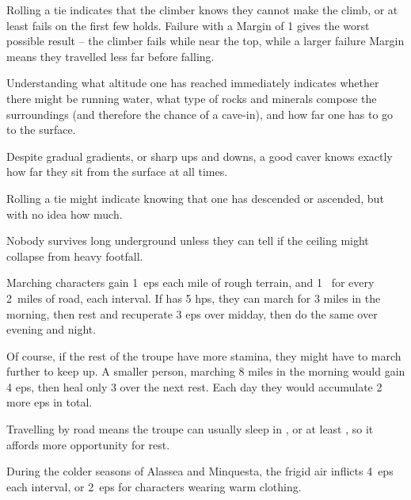 \begin{multicols}{2}

Rolling a tie indicates that the climber knows they cannot make the climb, or at least fails on the first few holds.
Failure with a Margin of 1 gives the worst possible result -- the climber fails while near the top, while a larger failure Margin means they travelled less far before falling.

Understanding what altitude one has reached immediately indicates whether there might be running water, what type of rocks and minerals compose the surroundings (and therefore the chance of a cave-in), and how far one has to go to the surface.

Despite gradual gradients, or sharp ups and downs, a good caver knows exactly how far they sit from the surface at all times.

Rolling a tie might indicate knowing that one has descended or ascended, but with no idea how much.

Nobody survives long underground unless they can tell if the ceiling might collapse from heavy footfall.


Marching characters gain 1~\glspl{ep} each mile of rough terrain, and 1~ for every 2~miles of road, each \gls{interval}.
If  has 5 \glspl{hp}, they can march for 3 miles in the morning, then rest and recuperate 3 \glspl{ep} over midday, then do the same over evening and night.

Of course, if the rest of the troupe have more stamina, they might have to march further to keep up.
A smaller person, marching 8 miles in the morning would gain 4 \glspl{ep}, then heal only 3 over the next rest.
Each day they would accumulate 2 more \glspl{ep} in total.

Travelling by road means the troupe can usually sleep in ,  or at least , so it affords more opportunity for rest.

During the colder seasons of \gls{Alassea} and \gls{Minquesta}, the frigid air inflicts 4~\glspl{ep} each \gls{interval}, or 2~\glspl{ep} for characters wearing warm clothing.


\end{multicols}
